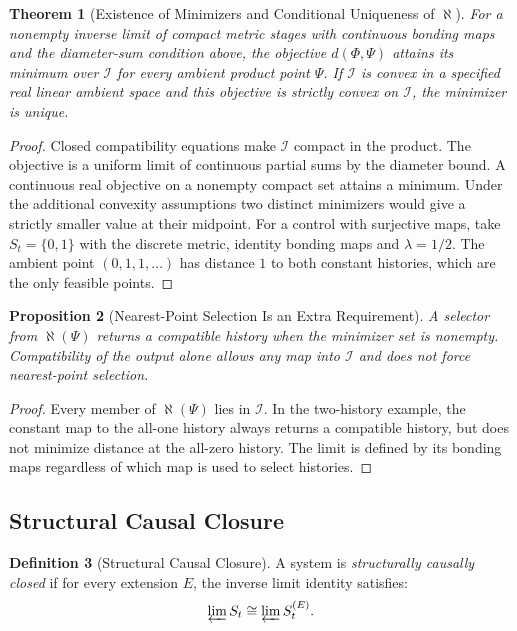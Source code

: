 \documentclass[11pt,a4paper]{article}
\theoremstyle{plain}
\newtheorem{theorem}{Theorem}[section]
\newtheorem{proposition}[theorem]{Proposition}
\theoremstyle{definition}
\newtheorem{definition}[theorem]{Definition}
\theoremstyle{remark}
\begin{document}
\begin{theorem}[Existence of Minimizers and Conditional Uniqueness of $\aleph$]\label{thm:aleph-unique}
For a nonempty inverse limit of compact metric stages with continuous bonding maps and the diameter-sum condition above, the objective $d(\Phi,\Psi)$ attains its minimum over $\mathcal I$ for every ambient product point $\Psi$. If $\mathcal I$ is convex in a specified real linear ambient space and this objective is strictly convex on $\mathcal I$, the minimizer is unique.
\end{theorem}
\begin{proof}
Closed compatibility equations make $\mathcal I$ compact in the product. The objective is a uniform limit of continuous partial sums by the diameter bound. A continuous real objective on a nonempty compact set attains a minimum. Under the additional convexity assumptions two distinct minimizers would give a strictly smaller value at their midpoint. For a control with surjective maps, take $S_t=\{0,1\}$ with the discrete metric, identity bonding maps and $\lambda=1/2$. The ambient point $(0,1,1,\ldots)$ has distance $1$ to both constant histories, which are the only feasible points.
\end{proof}


\begin{proposition}[Nearest-Point Selection Is an Extra Requirement]
A selector from $\aleph(\Psi)$ returns a compatible history when the minimizer set is nonempty. Compatibility of the output alone allows any map into $\mathcal I$ and does not force nearest-point selection.
\end{proposition}
\begin{proof}
Every member of $\aleph(\Psi)$ lies in $\mathcal I$. In the two-history example, the constant map to the all-one history always returns a compatible history, but does not minimize distance at the all-zero history. The limit is defined by its bonding maps regardless of which map is used to select histories.
\end{proof}

\subsection{Structural Causal Closure}

\begin{definition}[Structural Causal Closure]\label{def:causal-closure}
A system is \textit{structurally causally closed} if for every extension $E$, the inverse limit identity satisfies:
\begin{equation}
    \varprojlim S_t \cong \varprojlim S_t^{(E)}.
\end{equation}
\end{definition}
\end{document}
